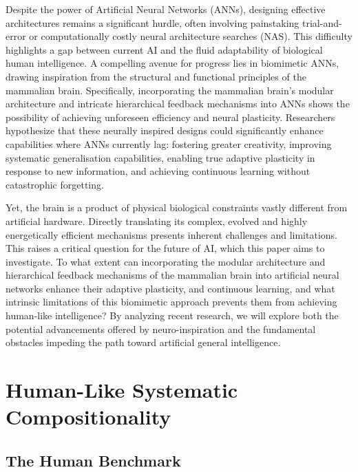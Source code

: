 \documentclass[
10pt, %
a4paper, %
oneside, %
headinclude,footinclude, %
BCOR5mm, %
]{scrartcl}
\begin{document}
Despite the power of Artificial Neural Networks (ANNs), designing effective architectures remains a significant hurdle, often involving painstaking trial-and-error or computationally costly neural architecture searches (NAS). This difficulty highlights a gap between current AI and the fluid adaptability of biological human intelligence. A compelling avenue for progress lies in biomimetic ANNs, drawing inspiration from the structural and functional principles of the mammalian brain. Specifically, incorporating the mammalian brain's modular architecture and intricate hierarchical feedback mechanisms into ANNs shows the possibility of achieving unforeseen efficiency and neural plasticity. Researchers hypothesize that these neurally inspired designs could significantly enhance capabilities where ANNs currently lag: fostering greater creativity, improving systematic generalisation capabilities, enabling true adaptive plasticity in response to new information, and achieving continuous learning without catastrophic forgetting.

Yet, the brain is a product of physical biological constraints vastly different from artificial hardware. Directly translating its complex, evolved and highly energetically efficient mechanisms presents inherent challenges and limitations. This raises a critical question for the future of AI, which this paper aims to investigate. To what extent can incorporating the modular architecture and hierarchical feedback mechanisms of the mammalian brain into artificial neural networks enhance their adaptive plasticity, and continuous learning, and what intrinsic limitations of this biomimetic approach prevents them from achieving human-like intelligence? By analyzing recent research, we will explore both the potential advancements offered by neuro-inspiration and the fundamental obstacles impeding the path toward artificial general intelligence.


\section{Human-Like Systematic Compositionality}

\subsection{The Human Benchmark}
\end{document}
